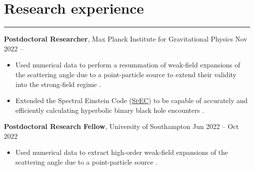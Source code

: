 \documentclass[10.5pt, oneside]{article}   	%
\begin{document}
 
 
\begin{center}
\huge
\href{mailto:oliver.long@aei.mpg.de}{} \:
\textcolor{Orcidcolour}{\href{https://orcid.org/0000-0002-3897-9272}{}} \:
\textcolor{RGcolour}{\href{https://www.researchgate.net/profile/Oliver-Long-3}{}} \:
\textcolor{LIcolour}{\href{https://www.linkedin.com/in/oliverflong/}{}} \:
\href{https://scholar.google.com/citations?user=92pSUO0AAAAJ&hl=en}{} \:
\href{https://oliverlong.info}{}
\end{center}

 \vspace{1mm}


{\color{Sectioncolour}
\section*{Research experience} 
\vspace{-3mm}
\noindent\rule{\linewidth}{0.6pt}}

\textbf{Postdoctoral Researcher}, Max Planck Institute for Gravitational Physics \hfill Nov 2022 --\\ \vspace{-5mm}
\begin{itemize}
\item Used numerical data to perform a resummation of weak-field expansions of the scattering angle due to a point-particle source to extend their validity into the strong-field regime \cite{Long:2024ltn}.
\item Extended the Spectral Einstein Code (\href{https://www.black-holes.org/for-researchers/spec}{\textsc{SpEC}}) to be capable of accurately and efficiently calculating hyperbolic binary black hole encounters \cite{Long:2025nmj,Scheel:2025jct}.
\end{itemize}

\textbf{Postdoctoral Research Fellow}, University of Southampton \hfill Jun 2022 -- Oct 2022\\ 
\vspace{-5mm}
\begin{itemize}
\item Used numerical data to extract high-order weak-field expansions of the scattering angle due to a point-particle source \cite{Barack:2023oqp}.
\end{itemize}
\end{document}
